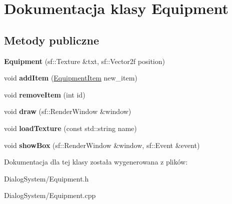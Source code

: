 \hypertarget{class_equipment}{\section{Dokumentacja klasy Equipment}
\label{class_equipment}
}
\subsection*{Metody publiczne}
\begin{DoxyCompactItemize}
\item 
\hypertarget{class_equipment_af18f784a9c9c38469a114748b08b47cb}{{\bfseries Equipment} (sf\-::\-Texture \&txt, sf\-::\-Vector2f position)}\label{class_equipment_af18f784a9c9c38469a114748b08b47cb}

\item 
\hypertarget{class_equipment_a8a6f3280ee540b9b812688a1d6fbbb3d}{void {\bfseries add\-Item} (\hyperlink{class_equipment_item}{Equipment\-Item} new\-\_\-item)}\label{class_equipment_a8a6f3280ee540b9b812688a1d6fbbb3d}

\item 
\hypertarget{class_equipment_ad80e042eb307687437579e8a6a307955}{void {\bfseries remove\-Item} (int id)}\label{class_equipment_ad80e042eb307687437579e8a6a307955}

\item 
\hypertarget{class_equipment_a0c4e6291ad7082d049a6d830df923a80}{void {\bfseries draw} (sf\-::\-Render\-Window \&window)}\label{class_equipment_a0c4e6291ad7082d049a6d830df923a80}

\item 
\hypertarget{class_equipment_aa10e2241bfd394059dd178e414583944}{void {\bfseries load\-Texture} (const std\-::string name)}\label{class_equipment_aa10e2241bfd394059dd178e414583944}

\item 
\hypertarget{class_equipment_a3921fcd8ded253cdcda46ea6b25c5013}{void {\bfseries show\-Box} (sf\-::\-Render\-Window \&window, sf\-::\-Event \&event)}\label{class_equipment_a3921fcd8ded253cdcda46ea6b25c5013}

\end{DoxyCompactItemize}


Dokumentacja dla tej klasy została wygenerowana z plików\-:\begin{DoxyCompactItemize}
\item 
Dialog\-System/Equipment.\-h\item 
Dialog\-System/Equipment.\-cpp\end{DoxyCompactItemize}
